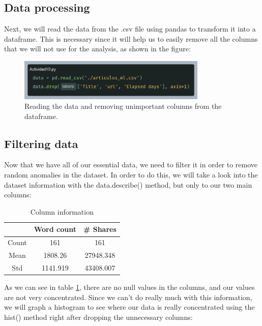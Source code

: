 \documentclass[10pt]{article}
\begin{document}
\subsection{Data processing}
Next, we will read the data from the .csv file using pandas to transform it into a dataframe. This is necessary since it will help us to easily remove all the columns that we will not use for the analysis, as shown in the figure: \par
\begin{figure}[h]
  \centering
  \includegraphics[width=90mm]{images/2025-03-25-10-23-22}
  \caption{Reading the data and removing unimportant columns from the dataframe.}
\end{figure}

\subsection{Filtering data}
Now that we have all of our essential data, we need to filter it in order to remove random anomalies in the dataset. In order to do this, we will take a look into the dataset information with the data.describe() method, but only to our two main columns:

\begin{table}[!ht]
  \centering
  \caption{Column information}
  \label{col_info}
    \begin{tabular}{|c|c|c|}
      \hline
       & Word count & \# Shares \\
      \hline
      Count & 161 & 161 \\
      \hline
      Mean & 1808.26 & 27948.348 \\
      \hline
      Std & 1141.919 & 43408.007 \\
      \hline
    \end{tabular}
\end{table}

As we can see in table \ref{col_info}, there are no null values in the columns, and our values are not very concentrated. Since we can't do really much with this information, we will graph a histogram to see where our data is really concentrated using the hist() method right after dropping the unnecessary columns: \par
\end{document}
